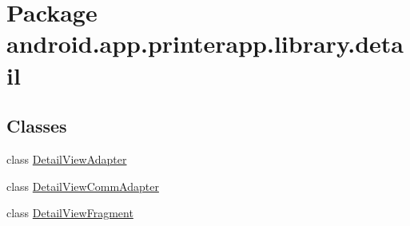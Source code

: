 \hypertarget{namespaceandroid_1_1app_1_1printerapp_1_1library_1_1detail}{}\section{Package android.\+app.\+printerapp.\+library.\+detail}
\label{namespaceandroid_1_1app_1_1printerapp_1_1library_1_1detail}
\subsection*{Classes}
\begin{DoxyCompactItemize}
\item 
class \hyperlink{classandroid_1_1app_1_1printerapp_1_1library_1_1detail_1_1_detail_view_adapter}{Detail\+View\+Adapter}
\item 
class \hyperlink{classandroid_1_1app_1_1printerapp_1_1library_1_1detail_1_1_detail_view_comm_adapter}{Detail\+View\+Comm\+Adapter}
\item 
class \hyperlink{classandroid_1_1app_1_1printerapp_1_1library_1_1detail_1_1_detail_view_fragment}{Detail\+View\+Fragment}
\end{DoxyCompactItemize}
